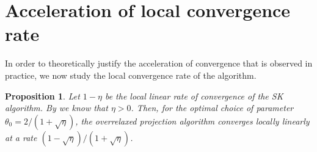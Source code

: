 \documentclass{article} %
\theoremstyle{plain}
\newtheorem{proposition}{Proposition}
\theoremstyle{definition}
\theoremstyle{remark}
\begin{document}
\section{Acceleration of local convergence rate}
\label{section:local}
In order to theoretically justify the acceleration of convergence that is observed in practice, we now study the local convergence rate of the algorithm. %

\begin{proposition}\label{prop:local}
Let $1-\eta$ be the local linear rate of convergence of the SK algorithm. By \cite{knight2008sinkhorn} we know that $\eta>0$. Then, for the optimal choice of parameter $\theta_0 = 2/(1+\sqrt{\eta})$, the overrelaxed projection algorithm converges locally linearly at a rate $(1-\sqrt{\eta})/(1+\sqrt{\eta})$.
\end{proposition}
\end{document}
